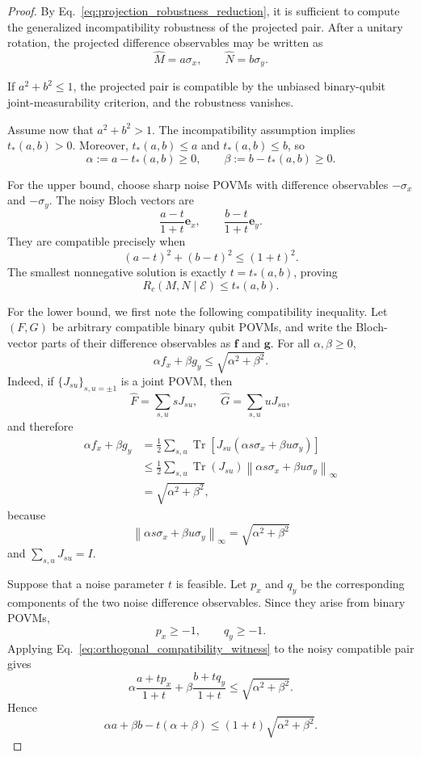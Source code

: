 \documentclass[10pt,a4paper]{amsart}
\DeclareMathOperator{\Tr}{Tr}
\begin{document}
\begin{proof}
By Eq.~\eqref{eq:projection_robustness_reduction}, it is sufficient to compute the generalized incompatibility robustness of the projected pair. After a unitary rotation, the projected difference observables may be written as
\[
\widehat M=a\sigma_x,
\qquad
\widehat N=b\sigma_y.
\]

If $a^2+b^2\le1$, the projected pair is compatible by the unbiased binary-qubit joint-measurability criterion, and the robustness vanishes.

Assume now that $a^2+b^2>1$. The incompatibility assumption implies $t_*(a,b)>0$. Moreover, $t_*(a,b)\le a$ and $t_*(a,b)\le b$, so
\[
\alpha:=a-t_*(a,b)\ge0,
\qquad
\beta:=b-t_*(a,b)\ge0.
\]

For the upper bound, choose sharp noise POVMs with difference observables $-\sigma_x$ and $-\sigma_y$. The noisy Bloch vectors are
\[
\frac{a-t}{1+t}\mathbf e_x,
\qquad
\frac{b-t}{1+t}\mathbf e_y.
\]
They are compatible precisely when
\[
(a-t)^2+(b-t)^2\le(1+t)^2.
\]
The smallest nonnegative solution is exactly $t=t_*(a,b)$, proving
\[
R_c(M,N\mid\mathcal E)\le t_*(a,b).
\]

For the lower bound, we first note the following compatibility inequality. Let $(F,G)$ be arbitrary compatible binary qubit POVMs, and write the Bloch-vector parts of their difference observables as $\mathbf f$ and $\mathbf g$. For all $\alpha,\beta\ge0$,
\begin{equation}
\alpha f_x+\beta g_y
\le
\sqrt{\alpha^2+\beta^2}.
\label{eq:orthogonal_compatibility_witness}
\end{equation}
Indeed, if $\{J_{su}\}_{s,u=\pm1}$ is a joint POVM, then
\[
\widehat F=\sum_{s,u}sJ_{su},
\qquad
\widehat G=\sum_{s,u}uJ_{su},
\]
and therefore
\begin{align*}
\alpha f_x+\beta g_y
&=
\frac12
\sum_{s,u}
\Tr\!\left[
J_{su}
(\alpha s\sigma_x+\beta u\sigma_y)
\right]
\\
&\le
\frac12
\sum_{s,u}
\Tr(J_{su})
\left\|
\alpha s\sigma_x+\beta u\sigma_y
\right\|_\infty
\\
&=
\sqrt{\alpha^2+\beta^2},
\end{align*}
because
\[
\left\|
\alpha s\sigma_x+\beta u\sigma_y
\right\|_\infty
=
\sqrt{\alpha^2+\beta^2}
\]
and $\sum_{s,u}J_{su}=I$.

Suppose that a noise parameter $t$ is feasible. Let $p_x$ and $q_y$ be the corresponding components of the two noise difference observables. Since they arise from binary POVMs,
\[
p_x\ge-1,
\qquad
q_y\ge-1.
\]
Applying Eq.~\eqref{eq:orthogonal_compatibility_witness} to the noisy compatible pair gives
\[
\alpha
\frac{a+tp_x}{1+t}
+
\beta
\frac{b+tq_y}{1+t}
\le
\sqrt{\alpha^2+\beta^2}.
\]
Hence
\begin{equation}
\alpha a+\beta b-t(\alpha+\beta)
\le
(1+t)\sqrt{\alpha^2+\beta^2}.
\label{eq:orthogonal_lower_intermediate}
\end{equation}


\end{proof}
\end{document}
